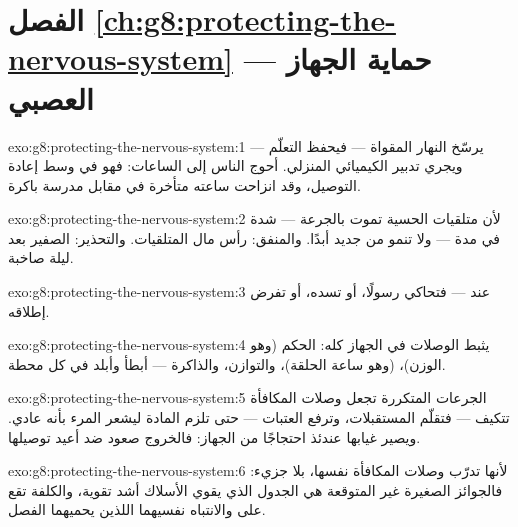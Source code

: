\section*{الفصل \ref{ch:g8:protecting-the-nervous-system} --- حماية الجهاز العصبي}

\begin{solution}{exo:g8:protecting-the-nervous-system:1}
يرسّخ  النهار المقواة --- فيحفظ التعلّم --- ويجري
تدبير  الكيميائي المنزلي.   أحوج
الناس إلى الساعات: فهو في وسط إعادة التوصيل، وقد انزاحت
ساعته متأخرة في مقابل مدرسة باكرة.
\end{solution}

\begin{solution}{exo:g8:protecting-the-nervous-system:2}
لأن متلقيات  الحسية تموت بالجرعة --- شدة في مدة ---
ولا تنمو من جديد أبدًا. والمنفق: رأس مال المتلقيات.
والتحذير: الصفير بعد ليلة صاخبة.
\end{solution}

\begin{solution}{exo:g8:protecting-the-nervous-system:3}
عند  --- فتحاكي رسولًا، أو تسده، أو تفرض إطلاقه.
\end{solution}

\begin{solution}{exo:g8:protecting-the-nervous-system:4}
يثبط الوصلات في الجهاز كله: الحكم (وهو الوزن)،  (وهو ساعة الحلقة)، والتوازن، والذاكرة --- أبطأ
وأبلد في كل محطة.
\end{solution}

\begin{solution}{exo:g8:protecting-the-nervous-system:5}
الجرعات المتكررة تجعل وصلات المكافأة تتكيف --- فتقلّم
المستقبلات، وترفع العتبات --- حتى تلزم المادة ليشعر
المرء بأنه عادي. ويصير غيابها عندئذ احتجاجًا من الجهاز:
فالخروج صعود ضد  أعيد توصيلها.
\end{solution}

\begin{solution}{exo:g8:protecting-the-nervous-system:6}
لأنها تدرّب وصلات المكافأة نفسها، بلا جزيء: فالجوائز
الصغيرة غير المتوقعة هي الجدول الذي يقوي الأسلاك أشد
تقوية، والكلفة تقع على  والانتباه نفسيهما اللذين
يحميهما الفصل.
\end{solution}

